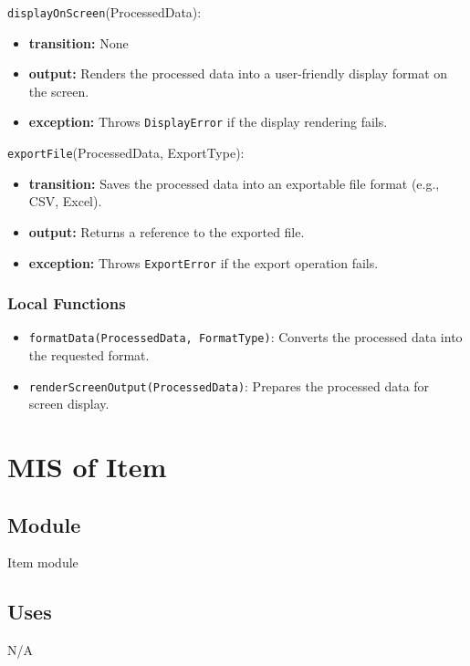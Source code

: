 \documentclass[12pt, titlepage]{article}
\begin{document}
\noindent \texttt{displayOnScreen}(ProcessedData):
\begin{itemize}
    \item \textbf{transition:} None
    \item \textbf{output:} Renders the processed data into a user-friendly display format on the screen.
    \item \textbf{exception:} Throws \texttt{DisplayError} if the display rendering fails.
\end{itemize}

\noindent \texttt{exportFile}(ProcessedData, ExportType):
\begin{itemize}
    \item \textbf{transition:} Saves the processed data into an exportable file format (e.g., CSV, Excel).
    \item \textbf{output:} Returns a reference to the exported file.
    \item \textbf{exception:} Throws \texttt{ExportError} if the export operation fails.
\end{itemize}

\subsubsection{Local Functions}

\begin{itemize}
    \item \texttt{formatData(ProcessedData, FormatType)}: Converts the processed data into the requested format.
    \item \texttt{renderScreenOutput(ProcessedData)}: Prepares the processed data for screen display.
\end{itemize}

\newpage


\section{MIS of Item}\label{item_module}

\subsection{Module}

Item module

\subsection{Uses}
N/A
\end{document}
